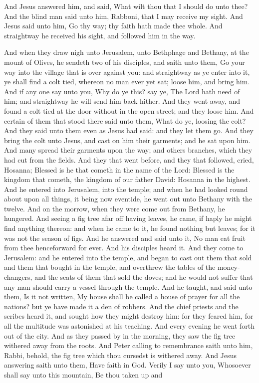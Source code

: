 And Jesus answered him, and said, What wilt thou that I should do unto thee? And the blind man said unto him, Rabboni, that I may receive my sight. And Jesus said unto him, Go thy way; thy faith hath made thee whole. And straightway he received his sight, and followed him in the way. 

And when they draw nigh unto Jerusalem, unto Bethphage and Bethany, at the mount of Olives, he sendeth two of his disciples, and saith unto them, Go your way into the village that is over against you: and straightway as ye enter into it, ye shall find a colt tied, whereon no man ever yet sat; loose him, and bring him. And if any one say unto you, Why do ye this? say ye, The Lord hath need of him; and straightway he will send him back hither. And they went away, and found a colt tied at the door without in the open street; and they loose him. And certain of them that stood there said unto them, What do ye, loosing the colt? And they said unto them even as Jesus had said: and they let them go. And they bring the colt unto Jesus, and cast on him their garments; and he sat upon him. And many spread their garments upon the way; and others branches, which they had cut from the fields. And they that went before, and they that followed, cried, Hosanna; Blessed is he that cometh in the name of the Lord: Blessed is the kingdom that cometh, the kingdom of our father David: Hosanna in the highest.  And he entered into Jerusalem, into the temple; and when he had looked round about upon all things, it being now eventide, he went out unto Bethany with the twelve.  And on the morrow, when they were come out from Bethany, he hungered. And seeing a fig tree afar off having leaves, he came, if haply he might find anything thereon: and when he came to it, he found nothing but leaves; for it was not the season of figs. And he answered and said unto it, No man eat fruit from thee henceforward for ever. And his disciples heard it.  And they come to Jerusalem: and he entered into the temple, and began to cast out them that sold and them that bought in the temple, and overthrew the tables of the money-changers, and the seats of them that sold the doves; and he would not suffer that any man should carry a vessel through the temple. And he taught, and said unto them, Is it not written, My house shall be called a house of prayer for all the nations? but ye have made it a den of robbers. And the chief priests and the scribes heard it, and sought how they might destroy him: for they feared him, for all the multitude was astonished at his teaching.  And every evening he went forth out of the city.  And as they passed by in the morning, they saw the fig tree withered away from the roots. And Peter calling to remembrance saith unto him, Rabbi, behold, the fig tree which thou cursedst is withered away. And Jesus answering saith unto them, Have faith in God. Verily I say unto you, Whosoever shall say unto this mountain, Be thou taken up and 